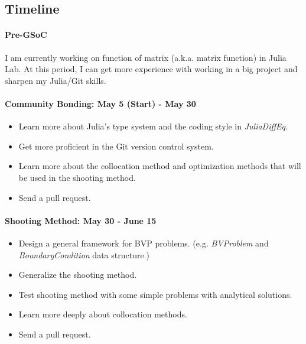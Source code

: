 \documentclass[a4paper,11pt,onecolumn]{article}
\begin{document}

\subsection{Timeline}
\paragraph{Pre-GSoC} %
\label{par:pre_gsoc}
I am currently working on function of matrix (a.k.a. matrix function) in Julia Lab. At this
period, I can get more experience with working in a big project and sharpen my Julia/Git skills.

\paragraph{Community Bonding: May 5 (Start) - May 30} %
\label{par:community_bonding}
\begin{itemize}
	\item Learn more about Julia's type system and the coding style in \textit{JuliaDiffEq}.
	\item Get more proficient in the Git version control system.
	\item Learn more about the collocation method and optimization methods that will be
	used in the shooting method.
	\item Send a pull request.
\end{itemize}

\paragraph{Shooting Method: May 30 - June 15} %
\label{par:shooting_method_may_30_june_15}
\begin{itemize}
	\item Design a general framework for BVP problems. (e.g. \textit{BVProblem} and \textit{
	BoundaryCondition} data structure.)
	\item Generalize the shooting method.
	\item Test shooting method with some simple problems with analytical solutions.
	\item Learn more deeply about collocation methods.
	\item Send a pull request.
\end{itemize}
\end{document}
